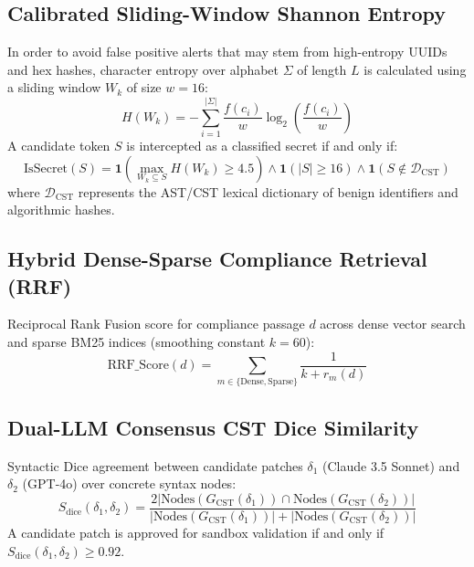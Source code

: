 \documentclass[runningheads]{llncs}
\begin{document}
\subsection{Calibrated Sliding-Window Shannon Entropy}
In order to avoid false positive alerts that may stem from high-entropy UUIDs and hex hashes, character entropy over alphabet $\Sigma$ of length $L$ is calculated using a sliding window $W_k$ of size $w = 16$:
\begin{equation}
H(W_k) = -\sum_{i=1}^{|\Sigma|} \frac{f(c_i)}{w} \log_2 \left(\frac{f(c_i)}{w}\right)
\end{equation}
A candidate token $S$ is intercepted as a classified secret if and only if:
\begin{equation}
\mathrm{IsSecret}(S) = \mathbf{1}\left(\max_{W_k \subseteq S} H(W_k) \ge 4.5\right) \land \mathbf{1}(|S| \ge 16) \land \mathbf{1}(S \notin \mathcal{D}_{\mathrm{CST}})
\end{equation}
where $\mathcal{D}_{\mathrm{CST}}$ represents the AST/CST lexical dictionary of benign identifiers and algorithmic hashes.

\subsection{Hybrid Dense-Sparse Compliance Retrieval (RRF)}
Reciprocal Rank Fusion score for compliance passage $d$ across dense vector search and sparse BM25 indices (smoothing constant $k = 60$):
\begin{equation}
\mathrm{RRF\_Score}(d) = \sum_{m \in \{\mathrm{Dense}, \mathrm{Sparse}\}} \frac{1}{k + r_m(d)}
\end{equation}

\subsection{Dual-LLM Consensus CST Dice Similarity}
Syntactic Dice agreement between candidate patches $\delta_1$ (Claude 3.5 Sonnet) and $\delta_2$ (GPT-4o) over concrete syntax nodes:
\begin{equation}
S_{\mathrm{dice}}(\delta_1, \delta_2) = \frac{2 |\mathrm{Nodes}(G_{\mathrm{CST}}(\delta_1)) \cap \mathrm{Nodes}(G_{\mathrm{CST}}(\delta_2))|}{|\mathrm{Nodes}(G_{\mathrm{CST}}(\delta_1))| + |\mathrm{Nodes}(G_{\mathrm{CST}}(\delta_2))|}
\end{equation}
A candidate patch is approved for sandbox validation if and only if $S_{\mathrm{dice}}(\delta_1, \delta_2) \ge 0.92$.
\end{document}

